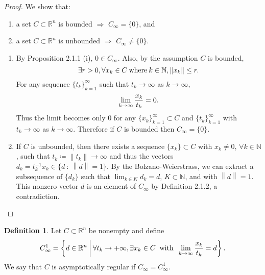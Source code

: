 \documentclass[a4paper,11pt, oneside]{book}
\theoremstyle{definition}
\newtheorem{dfn}{Definition}[section]
\newcommand{\NaturalNumberSet}{\mathbb{N}}
\newcommand{\NDemenstionalRealEuclideanSpace}{\mathbb{R}^n}
\begin{document}
\begin{proof}
  We show that:

  \begin{enumerate}[label=\roman*,align=CenterWithParen]
    \item a set $C \subset \NDemenstionalRealEuclideanSpace$ is bounded $\Rightarrow $ $C_{\infty} = \{0\}$, and
    \item a set $C \subset \NDemenstionalRealEuclideanSpace$ is unbounded $\Rightarrow $ $C_{\infty} \ne \{0\}$.
  \end{enumerate}

  \begin{enumerate}[label=\roman*,align=CenterWithParen]
    \item By Proposition 2.1.1 (i), $0 \in C_{\infty}$. Also, by the assumption $C$ is bounded,
    \begin{equation}
      \exists r > 0, \forall x_k \in C \:\text{where}\: k \in \NaturalNumberSet,  \left\lVert x_k \right\rVert \leq r. \notag
    \end{equation}
    For any sequence $\{t_k\}_{k=1}^{\infty}$ such that $t_k \rightarrow \infty$ as $k \rightarrow \infty$,
    \begin{equation}
      \lim_{k \to \infty} \frac{x_k}{t_k} = 0. \notag
    \end{equation}
    Thus the limit becomes only 0 for any $\{x_k\}_{k=1}^{\infty} \subset C$ and $\{t_k\}_{k=1}^{\infty}$ with $t_k \rightarrow \infty$ as $k \rightarrow \infty$. Therefore if $C$ is bounded then $C_{\infty} = \{0\}$.

    \item If $C$ is unbounded, then there exists a sequence $\{x_k\} \subset C$ with $x_k \ne 0$, $\forall k \in \NaturalNumberSet$, such that $t_k \coloneqq \left\lVert t_k \right\rVert \rightarrow \infty$ and thus the vectors $d_k = t_k^{-1} x_k \in \{ d \:\colon\: \left\lVert d\right\rVert = 1 \}$. By the Bolzano-Weierstrass, we can extract a subsequence of $\{d_k\}$ such that $\lim_{k \in K} d_k = d$, $K \subset \NaturalNumberSet$, and with $\left\lVert d \right\rVert = 1$. This nonzero vector $d$ is an element of $C_{\infty}$ by Definition 2.1.2, a contradiction.
  \end{enumerate}
\end{proof}

\begin{dfn}
  Let $C \subset \NDemenstionalRealEuclideanSpace$ be nonempty and define
  \begin{equation}
    C_{\infty}^1 = \left\{d \in \NDemenstionalRealEuclideanSpace \:\middle|\: \forall t_k \rightarrow + \infty , \exists x_k \in C \:\text{ with }\: \lim_{k \to \infty} \frac{x_k}{t_k} = d \right\}. \notag
  \end{equation}
  We say that $C$ is asymptotically regular if $C_{\infty} = C_{\infty}^1$.
\end{dfn}
\end{document}
